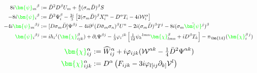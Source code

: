 \documentclass[letter,12pt]{article} %
\def\physical#1{ {\color{green} {\bm {#1}} } }
\def\auxiliary#1{ {\color{yellow} {\bm {#1}} } }
\def\grinoXX{ \physical{\psi} }
\def\grinoXY{ \physical{\psi} }
\def\grinoYX{ \physical{\psi} }
\def\grinoYY{ \physical{\psi} }
\def\spinorYY{ \physical{\chi} }
\def\spinorYYY{ \physical{\chi} }
\def\d{ \auxiliary{d_X} }
\def\dX{ \auxiliary{d} }
\def\dY{ \auxiliary{d} }
\def\dYY{ \auxiliary{d} }
\def\f{\auxiliary{f} }
\def\l{ \auxiliary{\lambda} }
\def\y{ \auxiliary{y} }
\def\t{ \auxiliary{t} }
\def\r{ \auxiliary{\rho} }
\def\X{X}
\def\T{T}
\begin{document}
{%
\begin{align}
8i \grinoXX_m{}^\beta &:= \bar D^2 D^{\beta} U_{m} 
	+\tfrac 4{3} (\sigma_m\bar D)^\beta S
\cr
-8i \grinoYX_i{}^\beta &:= \bar D^2 \Psi_i^\beta
	-\tfrac {2i}{3}\left[
	2 (\sigma_m\bar D)^\beta \X_i^{m} - D^\alpha \T_i
	-4i \mathcal W_i^\alpha
	\right]
\cr	
-4i\grinoXY_m{}^{\beta j}&:=
	[D\sigma_m \bar D]\Psi^{\beta j}
	-4i \partial^j (D\bar \sigma_m \sigma_n )^\beta U^n
	-2i (\sigma_m\bar D )^\beta \T^j
	-8i (\sigma_m \bar \grinoXY^j)^\beta 
\cr
\grinoYY_i{}^{\beta j} &:= i h_i{}^j(\spinorYYY_{ijk}^\beta)
	+\partial_{i}\Psi^{\beta j}
	-\tfrac i{3} \varphi_i{}^{jk}\left[ 
		\tfrac1{12}\psi_k{}^{lmn}\spinorYYY^\beta_{lmn}
		+i D^\beta \T_k\right]
	- \pi_{\bm{14}}
	( \spinorYY_{i}^{\beta\, j})
\nonumber
\end{align}
\begin{align}
\spinorYY_{ij}^\alpha &:=\widehat W_{ij}^\alpha 
	+i\varphi_{ijk} (\mathcal W^{\alpha k} -\tfrac14 \bar D^2 \Psi^{\alpha k})
\cr
\spinorYYY_{ijk}^\alpha&:= D^\alpha \left( F_{ijk} - 3i \varphi_{l[ij} \partial_{k]} \mathcal V^l\right)
\nonumber
\end{align}
}
\end{document}
